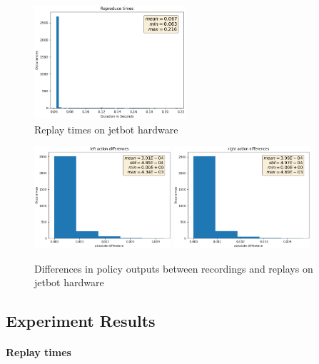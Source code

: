 \begin{figure}
    \centering
    \includegraphics[width=0.5\textwidth]{Bilder/notebook_images/replay_times.png}
    \caption{Replay times on jetbot hardware}
    \label{fig:result_replay_times}
\end{figure} %


\begin{figure}
    \centering
    \includegraphics[width=0.45\textwidth]{Bilder/notebook_images/replay_outputs_action_left.png}
    \includegraphics[width=0.45\textwidth]{Bilder/notebook_images/replay_outputs_action_right.png}
    \caption{Differences in policy outputs between recordings and replays on jetbot hardware}
    \label{fig:result_replay_outputs}
\end{figure} %


\subsection{Experiment Results}

\paragraph{Replay times}

